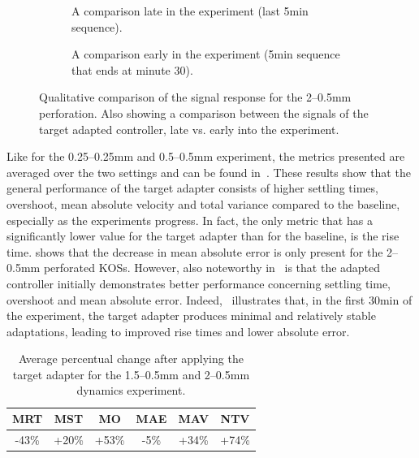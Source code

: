 \begin{figure}
    \begin{subfigure}{\linewidth}
        \centering
        
        \vspace*{-2em}
        \caption{A comparison late in the experiment (last 5\si{\minute} sequence).}
        \label{fig:200--50-adapter}
    \end{subfigure}
    \begin{subfigure}{\linewidth}
        \centering
        
        \vspace*{-2em}
        \caption{A comparison early in the experiment (5\si{\minute} sequence that ends at minute 30).}
        \label{fig:200--50-adapter5}
    \end{subfigure}
    \caption{Qualitative comparison of the signal response for the 2--0.5\si{\mm} perforation.
    Also showing a comparison between the signals of the target adapted controller, late vs. early into the experiment.}
    \label{fig:200--50-qualitative}
\end{figure}

Like for the 0.25--0.25\si{\mm} and 0.5--0.5\si{\mm} experiment, the metrics presented are averaged over the two settings and can be found in~.
These results show that the general performance of the target adapter consists of higher settling times, overshoot, mean absolute velocity and total variance compared to the baseline, especially as the experiments progress.
In fact, the only metric that has a significantly lower value for the target adapter than for the baseline, is the rise time.
 shows that the decrease in mean absolute error is only present for the 2--0.5\si{\mm} perforated KOSs.
However, also noteworthy in~ is that the adapted controller initially demonstrates better performance concerning settling time, overshoot and mean absolute error.
Indeed,~ illustrates that, in the first 30\si{\minute} of the experiment, the target adapter produces minimal and relatively stable adaptations, leading to improved rise times and lower absolute error.

\begin{table}
    \centering
    \caption{Average percentual change after applying the target adapter for the 1.5--0.5\si{\mm} and 2--0.5\si{\mm} dynamics experiment.}
    \label{tab:150--50-200--50-percent}
    \begin{tabular}{cccccc}
        \toprule
        MRT              & MST              & MO               & MAE             & MAV              & NTV              \\
        \midrule
        -43\si{\percent} & +20\si{\percent} & +53\si{\percent} & -5\si{\percent} & +34\si{\percent}  & +74\si{\percent}\\
        \bottomrule
    \end{tabular}
\end{table}

